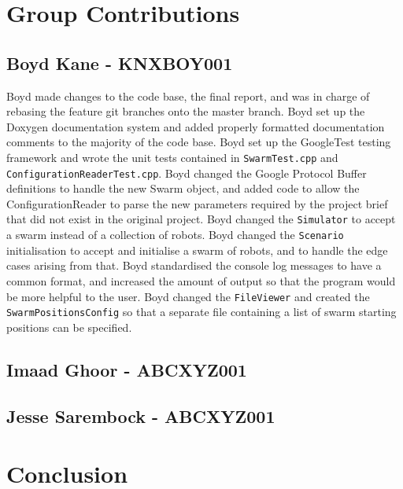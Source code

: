 \documentclass[11pt,a4paper]{article}
\begin{document}
\section{Group Contributions}
\label{s:group-contributions}

\subsection{Boyd Kane - KNXBOY001}
Boyd made changes to the code base, the final report, and was in charge of
rebasing the feature git branches onto the master branch. Boyd set up the
Doxygen documentation system and added properly formatted documentation comments
to the majority of the code base. Boyd set up the GoogleTest testing framework
and wrote the unit tests contained in \texttt{SwarmTest.cpp} and
\texttt{ConfigurationReaderTest.cpp}. Boyd changed the Google Protocol Buffer
definitions to handle the new Swarm object, and added code to allow the
ConfigurationReader to parse the new parameters required by the project brief
that did not exist in the original project. Boyd changed the
\texttt{Simulator} to accept a swarm instead of a collection of robots. Boyd
changed the \texttt{Scenario} initialisation to accept and initialise a swarm
of robots, and to handle the edge cases arising from that. Boyd standardised
the console log messages to have a common format, and increased the amount of
output so that the program would be more helpful to the user. Boyd changed the
\texttt{FileViewer} and created the \texttt{SwarmPositionsConfig} so that a
separate file containing a list of swarm starting positions can be specified.

\subsection{Imaad Ghoor - ABCXYZ001}


\subsection{Jesse Sarembock - ABCXYZ001}

\section{Conclusion}
\label{s:conclusion}
\end{document}
